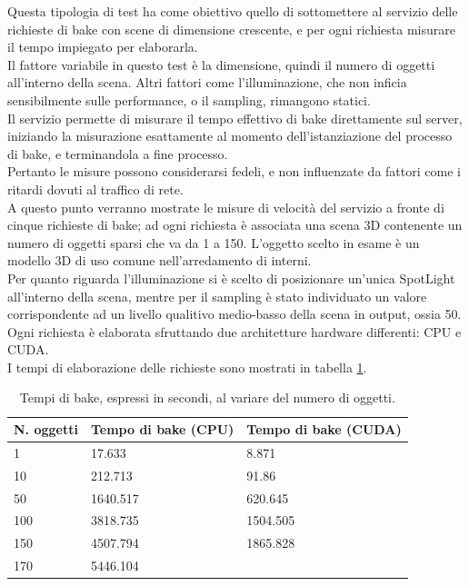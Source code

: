Questa tipologia di test ha come obiettivo quello di sottomettere al servizio delle richieste di bake con scene di dimensione crescente, e per ogni richiesta misurare il tempo impiegato per elaborarla. 
\\
Il fattore variabile in questo test è la dimensione, quindi il numero di oggetti all’interno della scena. Altri fattori come l’illuminazione, che non inficia sensibilmente sulle performance, o il sampling, rimangono statici. 
\\
Il servizio permette di misurare il tempo effettivo di bake direttamente sul server, iniziando la misurazione esattamente al momento dell’istanziazione del processo di bake, e terminandola a fine processo. 
\\
Pertanto le misure possono considerarsi fedeli, e non influenzate da fattori come i ritardi dovuti al traffico di rete. 
\\
A questo punto verranno mostrate le misure di velocità del servizio a fronte di cinque richieste di bake; ad ogni richiesta è associata una scena 3D contenente un numero di oggetti sparsi che va da 1 a 150. L’oggetto scelto in esame è un modello 3D di uso comune nell’arredamento di interni. 
\\
Per quanto riguarda l’illuminazione si è scelto di posizionare un’unica SpotLight all’interno della scena, mentre per il sampling è stato individuato un valore corrispondente ad un livello qualitivo medio-basso della scena in output, ossia 50. 
\\
Ogni richiesta è elaborata sfruttando due architetture hardware differenti: CPU e CUDA.
\\
I tempi di elaborazione delle richieste sono mostrati in tabella \ref{table:per_num_ob}.
\newpage
\begin{table}[]
\centering
\caption[Performance al variare degli oggetti]{Tempi di bake, espressi in secondi, al variare del numero di oggetti.}
\begin{tabular}{|l|l|l}
\hline
\textbf{N. oggetti} & \textbf{Tempo di bake (CPU)} & \multicolumn{1}{l|}{\textbf{Tempo di bake (CUDA)}} \\ \hline
1 & 17.633 & \multicolumn{1}{l|}{8.871} \\ \hline
10 & 212.713 & \multicolumn{1}{l|}{91.86} \\ \hline
50 & 1640.517 & \multicolumn{1}{l|}{620.645} \\ \hline
100 & 3818.735 & \multicolumn{1}{l|}{1504.505} \\ \hline
150 & 4507.794 & \multicolumn{1}{l|}{1865.828} \\ \hline
170 & 5446.104 &  \\ \cline{1-2}
\end{tabular}
\label{table:per_num_ob}
\end{table}

